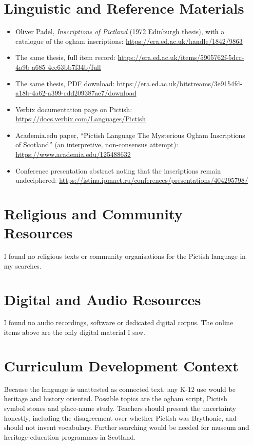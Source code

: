 \documentclass[12pt]{article}
\begin{document}
\section{Linguistic and Reference Materials}
\begin{itemize}
\item Oliver Padel, \emph{Inscriptions of Pictland} (1972 Edinburgh thesis), with a catalogue of the ogham inscriptions: \url{https://era.ed.ac.uk/handle/1842/9863}
\item The same thesis, full item record: \url{https://era.ed.ac.uk/items/5905762f-5dcc-4a9b-a685-4ee63bb7f34b/full}
\item The same thesis, PDF download: \url{https://era.ed.ac.uk/bitstreams/3e9154fd-a18b-4a62-a399-cdd209387ae7/download}
\item Verbix documentation page on Pictish: \url{https://docs.verbix.com/Languages/Pictish}
\item Academia.edu paper, ``Pictish Language The Mysterious Ogham Inscriptions of Scotland'' (an interpretive, non-consensus attempt): \url{https://www.academia.edu/125488632}
\item Conference presentation abstract noting that the inscriptions remain undeciphered: \url{https://istina.ipmnet.ru/conferences/presentations/404295798/}
\end{itemize}

\section{Religious and Community Resources}
I found no religious texts or community organisations for the Pictish language in my searches.

\section{Digital and Audio Resources}
I found no audio recordings, software or dedicated digital corpus. The online items above are the only digital material I saw.

\section{Curriculum Development Context}
Because the language is unattested as connected text, any K-12 use would be heritage and history oriented. Possible topics are the ogham script, Pictish symbol stones and place-name study. Teachers should present the uncertainty honestly, including the disagreement over whether Pictish was Brythonic, and should not invent vocabulary. Further searching would be needed for museum and heritage-education programmes in Scotland.
\end{document}
